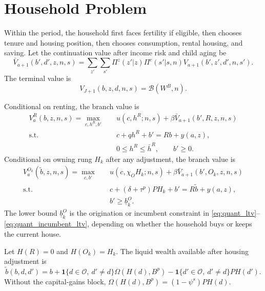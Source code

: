 \documentclass[11pt]{article}
\newcommand{\1}{\mathbf 1}
\newcommand{\Oset}{\mathcal O}
\newcommand{\Bcal}{\mathcal B}
\begin{document}
\section{Household Problem}

Within the period, the household first faces fertility if eligible, then
chooses tenure and housing position, then chooses consumption, rental housing,
and saving. Let the continuation value after income risk and child aging be
\begin{equation}
\bar V_{a+1}(b',d',z,n,s)
=
\sum_{z'}\sum_{s'}
\Pi^z(z'|z)\Pi^c(s'|s,n)
V_{a+1}(b',z',d',n,s').
\label{eq:quant_continuation}
\end{equation}
The terminal value is
\[
V_{J+1}(b,z,d,n,s)=\Bcal(W^B,n).
\]

Conditional on renting, the branch value is
\begin{equation}
\begin{aligned}
V_a^R(b,z,n,s)
=
\max_{c,h^R,b'}\quad
&u(c,h^R;n,s)+\beta \bar V_{a+1}(b',R,z,n,s)\\
\text{s.t.}\quad
&c+q h^R+b'=Rb+y(a,z),\\
&0\le h^R\le\bar h^R,\qquad b'\ge0.
\end{aligned}
\label{eq:quant_renter_problem}
\end{equation}
Conditional on owning rung $H_k$ after any adjustment, the branch value is
\begin{equation}
\begin{aligned}
V_a^{O_k}(\tilde b,z,n,s)
=
\max_{c,b'}\quad
&u(c,\chi_OH_k;n,s)+\beta \bar V_{a+1}(b',O_k,z,n,s)\\
\text{s.t.}\quad
&c+(\delta+\tau^p)PH_k+b'=R\tilde b+y(a,z),\\
&b'\ge \underline b^O_k.
\end{aligned}
\label{eq:quant_owner_problem}
\end{equation}
The lower bound $\underline b^O_k$ is the origination or incumbent constraint
in \eqref{eq:quant_ltv}--\eqref{eq:quant_incumbent_ltv}, depending on whether
the household buys or keeps the current house.

Let $H(R)=0$ and $H(O_k)=H_k$. The liquid wealth available after housing
adjustment is
\begin{equation}
\tilde b(b,d,d')
=
b
+\1\{d\in\Oset,\ d'\neq d\}\Omega(H(d),B^p)
-\1\{d'\in\Oset,\ d'\neq d\}PH(d').
\label{eq:quant_adjusted_wealth}
\end{equation}
Without the capital-gains block, $\Omega(H(d),B^p)=(1-\psi^s)PH(d)$.
\end{document}
